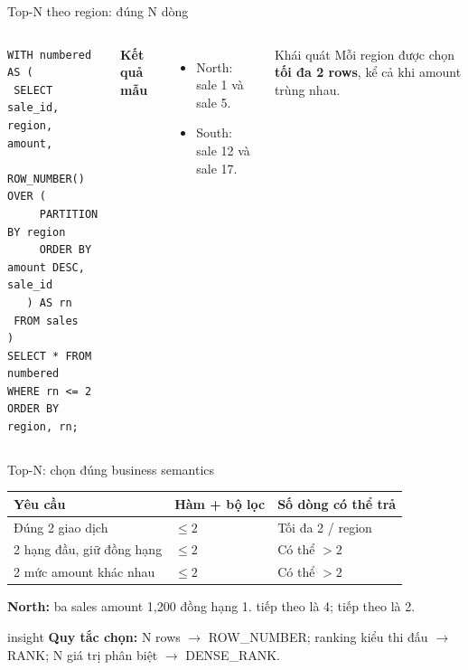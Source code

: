 \documentclass[aspectratio=169,11pt]{beamer}
\newcommand{\code}[1]{{\small\ttfamily\detokenize{#1}}}
\begin{document}
\begin{frame}[fragile]{Top-N theo region: đúng N dòng}
\begin{columns}[T,onlytextwidth]
\begin{lstlisting}[basicstyle=\ttfamily\fontsize{8.2}{9.399999999999999}\selectfont]
WITH numbered AS (
 SELECT sale_id, region, amount,
   ROW_NUMBER() OVER (
     PARTITION BY region
     ORDER BY amount DESC, sale_id
   ) AS rn
 FROM sales
)
SELECT * FROM numbered
WHERE rn <= 2
ORDER BY region, rn;
\end{lstlisting}

\textbf{Kết quả mẫu}\par
\begin{itemize}
\item North: sale 1 và sale 5.
\item South: sale 12 và sale 17.
\end{itemize}
\vspace{0.8em}
\begin{block}{Khái quát}
Mỗi region được chọn \textbf{tối đa 2 rows}, kể cả khi amount trùng nhau.
\end{block}

\end{columns}
\end{frame}

\begin{frame}[fragile]{Top-N: chọn đúng business semantics}

\begin{center}
\renewcommand{\arraystretch}{1.18}
\begin{tabular}{lll}
\toprule
Yêu cầu & Hàm + bộ lọc & Số dòng có thể trả \\
\midrule
Đúng 2 giao dịch & \code{ROW_NUMBER} $\leq 2$ & Tối đa 2 / region \\
2 hạng đầu, giữ đồng hạng & \code{RANK} $\leq 2$ & Có thể $>2$ \\
2 mức amount khác nhau & \code{DENSE_RANK} $\leq 2$ & Có thể $>2$ \\
\bottomrule
\end{tabular}
\end{center}
\vspace{0.5em}
\textbf{North:} ba sales amount 1,200 đồng hạng 1. \code{RANK} tiếp theo là 4; \code{DENSE_RANK} tiếp theo là 2.
\par\vspace{0.4em}
\begin{beamercolorbox}[wd=\linewidth,sep=1.1ex,rounded=true]{insight}
\textbf{Quy tắc chọn:} N rows $\to$ ROW\_NUMBER; ranking kiểu thi đấu $\to$ RANK; N giá trị phân biệt $\to$ DENSE\_RANK.
\end{beamercolorbox}
\end{frame}
\end{document}
